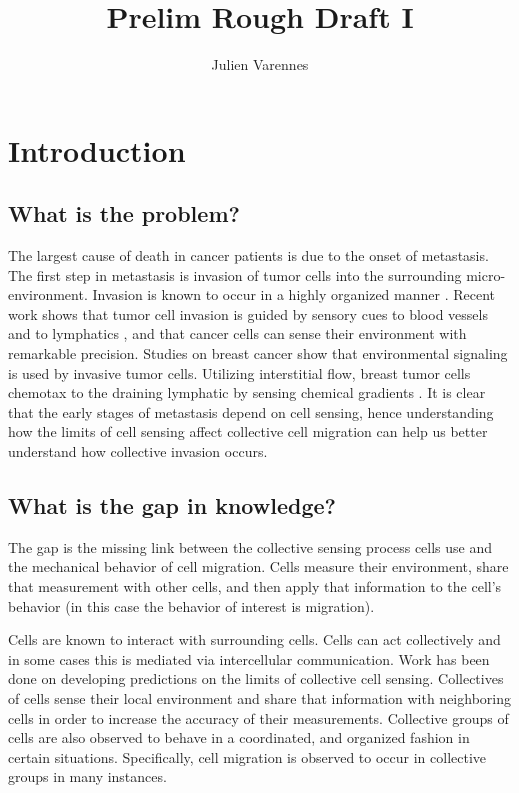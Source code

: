 \documentclass[a4paper]{article}
\title{Prelim Rough Draft I}
\author{Julien Varennes}
\begin{document}
\maketitle

\section{Introduction}

\subsection{What is the problem?}

The largest cause of death in cancer patients is due to the onset of metastasis. The first step in metastasis is invasion of tumor cells into the surrounding micro-environment. Invasion is known to occur in a highly organized manner \cite{friedl2012classifying}. Recent work shows that tumor cell invasion is guided by sensory cues to blood vessels and to lymphatics \cite{shields2007autologous}, and that cancer cells can sense their environment with remarkable precision. Studies on breast cancer show that environmental signaling is used by invasive tumor cells. Utilizing interstitial flow, breast tumor cells chemotax to the draining lymphatic by sensing chemical gradients \cite{shields2007autologous}. It is clear that the early stages of metastasis depend on cell sensing, hence understanding how the limits of cell sensing affect collective cell migration can help us better understand how collective invasion occurs.

\subsection{What is the gap in knowledge?}

The gap is the missing link between the collective sensing process cells use and the mechanical behavior of cell migration. Cells measure their environment, share that measurement with other cells, and then apply that information to the cell's behavior (in this case the behavior of interest is migration).

Cells are known to interact with surrounding cells. Cells can act collectively and in some cases this is mediated via intercellular communication. Work has been done on developing predictions on the limits of collective cell sensing. Collectives of cells sense their local environment and share that information with neighboring cells in order to increase the accuracy of their measurements. Collective groups of cells are also observed to behave in a coordinated, and organized fashion in certain situations. Specifically, cell migration is observed to occur in collective groups in many instances.
\end{document}
